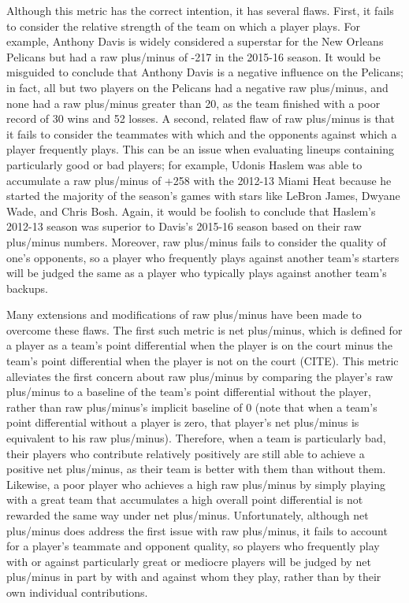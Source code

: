 Although this metric has the correct intention, it has several flaws. First, it
fails to consider the relative strength of the team on which a player plays. For
example, Anthony Davis is widely considered a superstar for the New Orleans Pelicans
but had a raw plus/minus of -217 in the 2015-16 season. It would be misguided to
conclude that Anthony Davis is a negative influence on the Pelicans; in fact, all
but two players on the Pelicans had a negative raw plus/minus, and none had a raw
plus/minus greater than 20, as the team finished with a poor record of 30 wins and
52 losses. A second, related flaw of raw plus/minus is that it fails to consider the
teammates with which and the opponents against which a player frequently plays. This
can be an issue when evaluating lineups containing particularly good or bad players;
for example, Udonis Haslem was able to accumulate a raw plus/minus of +258 with the
2012-13 Miami Heat because he started the majority of the season's games with stars
like LeBron James, Dwyane Wade, and Chris Bosh. Again, it would be foolish to
conclude that Haslem's 2012-13 season was superior to Davis's 2015-16 season based
on their raw plus/minus numbers. Moreover, raw plus/minus fails to consider the
quality of one's opponents, so a player who frequently plays against another team's
starters will be judged the same as a player who typically plays against another
team's backups.

Many extensions and modifications of raw plus/minus have been made to overcome these
flaws. The first such metric is net plus/minus, which is defined for a player as a
team's point differential when the player is on the court minus the team's point
differential when the player is not on the court (CITE). This metric alleviates the
first concern about raw plus/minus by comparing the player's raw plus/minus to a
baseline of the team's point differential without the player, rather than raw
plus/minus's implicit baseline of 0 (note that when a team's point differential
without a player is zero, that player's net plus/minus is equivalent to his raw
plus/minus).  Therefore, when a team is particularly bad, their players who
contribute relatively positively are still able to achieve a positive net
plus/minus, as their team is better with them than without them. Likewise, a poor
player who achieves a high raw plus/minus by simply playing with a great team that
accumulates a high overall point differential is not rewarded the same way under net
plus/minus. Unfortunately, although net plus/minus does address the first issue with
raw plus/minus, it fails to account for a player's teammate and opponent quality, so
players who frequently play with or against particularly great or mediocre players
will be judged by net plus/minus in part by with and against whom they play, rather
than by their own individual contributions.

